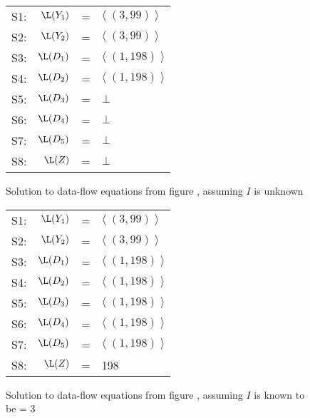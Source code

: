 \begin{figure}
\begin{center}
\begin{tabular}{r r c l}
\mbox{S1:} & $\L(Y_1)$ & = & $\langle \; (3,99)\; \rangle$ \\
\mbox{S2:} & $\L(Y_2)$ & = & $\langle \; (3,99)\; \rangle$ \\
\mbox{S3:} & $\L(D_1)$ & = & $\langle \; (1,198)\; \rangle$ \\
\mbox{S4:} & $\L(D_2)$ & = & $\langle \; (1,198)\; \rangle$ \\
\mbox{S5:} & $\L(D_3)$ & = & $\bot$\\
\mbox{S6:} & $\L(D_4)$ & = & $\bot$\\
\mbox{S7:} & $\L(D_5)$ & = & $\bot$\\
\mbox{S8:} & $\L(Z)$ & =  & $\bot$
\end{tabular}
\end{center}
\caption{Solution to data-flow equations from figure \protect{\ref{fig:sc-ex-df}}, assuming $I$ is unknown}
\label{fig:sc-ex-sol1}
\end{figure}

\begin{figure}
\begin{center}
\begin{tabular}{r r c l}
\mbox{S1:} & $\L(Y_1)$ & = & $\langle \; (3,99)\; \rangle$ \\
\mbox{S2:} & $\L(Y_2)$ & = & $\langle \; (3,99)\; \rangle$ \\
\mbox{S3:} & $\L(D_1)$ & = & $\langle \; (1,198)\; \rangle$ \\
\mbox{S4:} & $\L(D_2)$ & = & $\langle \; (1,198)\; \rangle$ \\
\mbox{S5:} & $\L(D_3)$ & = & $\langle \; (1,198)\; \rangle$ \\
\mbox{S6:} & $\L(D_4)$ & = & $\langle \; (1,198)\; \rangle$ \\
\mbox{S7:} & $\L(D_5)$ & = & $\langle \; (1,198)\; \rangle$ \\
\mbox{S8:} & $\L(Z)$ & =  & 198
\end{tabular}
\end{center}
\caption{Solution to data-flow equations from figure \protect{\ref{fig:sc-ex-df}}, assuming $I$ is known to be = 3}
\label{fig:sc-ex-sol2}
\end{figure}
